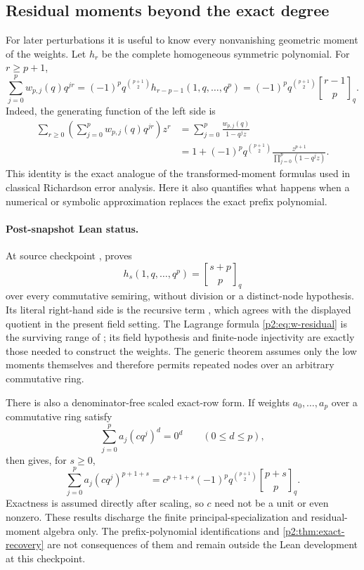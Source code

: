 \documentclass[11pt,oneside]{article}
\numberwithin{equation}{section}
\theoremstyle{definition}
\theoremstyle{remark}
\newcommand{\qbinom}[3]{\genfrac{[}{]}{0pt}{}{#1}{#2}_{#3}}
\begin{document}
\subsection{Residual moments beyond the exact degree}

For later perturbations it is useful to know every nonvanishing geometric moment of the weights.
Let $h_r$ be the complete homogeneous symmetric polynomial.  For $r\ge p+1$,
\begin{equation}
 \boxed{
 \sum_{j=0}^{p}w_{p,j}(q)q^{jr}
 =(-1)^pq^{\binom{p+1}{2}}
 h_{r-p-1}(1,q,\ldots,q^p)
 =(-1)^pq^{\binom{p+1}{2}}\qbinom{r-1}{p}{q}.
 }
 \label{p2:eq:w-residual}
\end{equation}
Indeed, the generating function of the left side is
\begin{align*}
 \sum_{r\ge0}\left(\sum_{j=0}^{p}w_{p,j}(q)q^{jr}\right)z^r
 &=\sum_{j=0}^{p}\frac{w_{p,j}(q)}{1-q^jz}\\
 &=1+(-1)^pq^{\binom{p+1}{2}}
 \frac{z^{p+1}}{\prod_{j=0}^{p}(1-q^jz)}.
\end{align*}
This identity is the exact analogue of the transformed-moment formulas used in classical
Richardson error analysis.  Here it also quantifies what happens when a numerical or symbolic
approximation replaces the exact prefix polynomial.

\paragraph{Post-snapshot Lean status.}
At source checkpoint ,
 proves
\[
 h_s(1,q,\ldots,q^p)=\qbinom{s+p}{p}{q}
\]
over every commutative semiring, without division or a distinct-node
hypothesis.  Its literal right-hand side is the recursive term
, which agrees with the displayed quotient
in the present field setting.  The Lagrange formula \eqref{p2:eq:w-residual} is
the surviving range of ; its
field hypothesis and finite-node injectivity are exactly those needed to
construct the weights.  The generic theorem
 assumes only the low moments
themselves and therefore permits repeated nodes over an arbitrary commutative
ring.

There is also a denominator-free scaled exact-row form.  If weights
\(a_0,\ldots,a_p\) over a commutative ring satisfy
\[
 \sum_{j=0}^{p}a_j(cq^j)^d=0^d\qquad(0\le d\le p),
\]
then  gives, for \(s\ge0\),
\[
 \sum_{j=0}^{p}a_j(cq^j)^{p+1+s}
 =c^{p+1+s}(-1)^p q^{\binom{p+1}{2}}\qbinom{p+s}{p}{q}.
\]
Exactness is assumed directly after scaling, so \(c\) need not be a unit or
even nonzero.  These results discharge the finite principal-specialization and
residual-moment algebra only.  The prefix-polynomial identifications and
\cref{p2:thm:exact-recovery} are not consequences
of them and remain outside the Lean development at this checkpoint.
\end{document}
